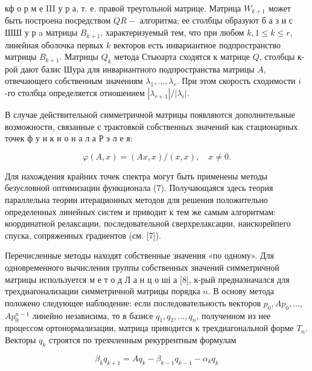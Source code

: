 \documentclass[10pt]{article}
\begin{document}
кф о р м е III у р а, т. е. правой треугольной матрице. Матрица $W_{k+1}$ может быть построена посредством $Q R-$ алгоритма; ее столбцы образуют б а з и с ШШ у р a матрицы $B_{k+1}$, характеризуемый тем, что при любом $k, 1 \leqslant k \leqslant r$, линейная оболочка первых $k$ векторов есть инвариантное подпространство матрицы $B_{k+1}$. Матрицы $Q_{k}$ метода Стьюарта сходятся к матрице $Q$, столбцы к-рой дают базис Шура для инвариантного подпространства матрицы $A$, отвечающего собственным значениям $\lambda_{1}, \ldots, \lambda_{r}$. При этом скорость сходимости $i$-го столбца определяется отношением $\left|\lambda_{r+1}\right| /\left|\lambda_{i}\right|$.



В случае действительной симметричной матрицы появляются дополнительные возможности, связанные с трактовкой собственных значений как стационарных точек ф у н к и о н а л а Р э л е я:



\[

\varphi(A, x)=(A x, x) /(x, x), \quad x \neq 0 .

\]



Для нахождения крайних точек спектра могут быть применены методы безусловной оптимизации функционала (7). Получающаяся здесь теория параллельна теории итерационных методов для решения положительно определенных линейных систем и приводит к тем же самым алгоритмам: координатной релаксации, последовательной сверхрелаксации, наискорейпего спуска, сопряженных градиентов (см. [7]).



Перечисленные методы находят собственные значения «по одному». Для одновременного вычисления группы собственных значений симметричной матрицы используется м е т о д Л а н ц о ші а [8], к-рый предназначался для трехдиагонализации симметричной матрицы порядка $n$. В основу метода положено следующее наблюдение: если последовательность векторов $p_{0}, A p_{0}, \ldots$, $A p_{0}^{n-1}$ линейно независима, то в базисе $q_{1}, q_{2}, \ldots, q_{n}$, полученном из нее процессом ортонормализации, матрица приводится к трехдиагональной форме $T_{n}$. Векторы $q_{k}$ строятся по трехчленным рекуррентным формулам



\[

\beta_{k} q_{k+1}=A q_{k}-\beta_{k-1} q_{k-1}-\alpha_{k} q_{k}

\]
\end{document}
